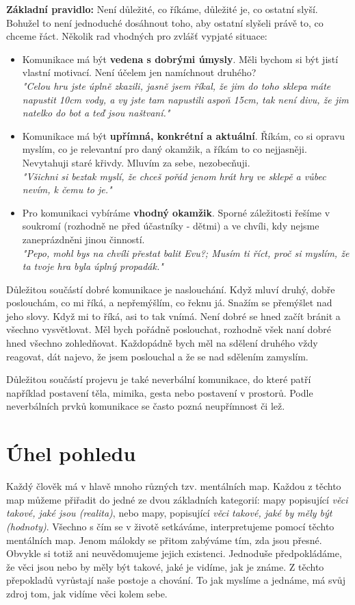 \documentclass[a4paper,12pt]{report}
\begin{document}
\textbf{Základní pravidlo:} Není důležité, co říkáme, důležité je, co ostatní slyší. Bohužel to není jednoduché dosáhnout toho, aby ostatní slyšeli právě to, co chceme řáct. Několik rad vhodných pro zvlášť vypjaté situace:

\begin{itemize}
 \item Komunikace má být \textbf{vedena s dobrými úmysly}. Měli bychom si být jistí vlastní motivací. Není účelem jen namíchnout druhého?\\
 \textit{"Celou hru jste úplně zkazili, jasně jsem říkal, že jim do toho sklepa máte napustit 10cm vody, a vy jste tam napustili aspoň 15cm, tak není divu, že jim natelko do bot a teď jsou naštvaní."}
 
 \item Komunikace má být \textbf{upřímná, konkrétní a aktuální}. Říkám, co si opravu myslím, co je relevantní pro daný okamžik, a říkám to co nejjasněji. Nevytahuji staré křivdy. Mluvím za sebe, nezobecňuji.\\
 \textit{"Všichni si beztak myslí, že chceš pořád jenom hrát hry ve sklepě a vůbec nevím, k čemu to je."}
 
 \item Pro komunikaci vybíráme \textbf{vhodný okamžik}. Sporné záležitosti řešíme v soukromí (rozhodně ne před účastníky - dětmi) a ve chvíli, kdy nejsme zaneprázdněni jinou činností.\\
 \textit{"Pepo, mohl bys na chvíli přestat balit Evu?; Musím ti říct, proč si myslím, že ta tvoje hra byla úplný propadák."}
\end{itemize}

Důležitou součástí dobré komunikace je naslouchání. Když mluví druhý, dobře poslouchám, co mi říká, a nepřemýšlím, co řeknu já. Snažím se přemýšlet nad jeho slovy. Když mi to říká, asi to tak vnímá. Není dobré se hned začít bránit a všechno vysvětlovat. Měl bych pořádně poslouchat, rozhodně všek naní dobré hned všechno zohledňovat. Každopádně bych měl na sdělení druhého vždy reagovat, dát najevo, že jsem poslouchal a že se nad sdělením zamyslím.

Důležitou součástí projevu je také neverbální komunikace, do které patří například postavení těla, mimika, gesta nebo postavení v prostorů. Podle neverbálních prvků komunikace se často pozná neupřímnost či lež.

\section[Úhel pohledu]{Úhel pohledu}
\pagelogos
Každý člověk má v hlavě mnoho různých tzv. mentálních map. Každou z těchto map můžeme přiřadit do jedné ze dvou základních kategorií: mapy popisující \textit{věci takové, jaké jsou (realita)}, nebo mapy, popisující \textit{věci takové, jaké by měly být (hodnoty)}. Všechno s čím se v životě setkáváme, interpretujeme pomocí těchto mentálních map. Jenom málokdy se přitom zabýváme tím, zda jsou přesné. Obvykle si totiž ani neuvědomujeme jejich existenci. Jednoduše předpokládáme, že věci jsou nebo by měly být takové, jaké je vidíme, jak je známe.
Z těchto přepokladů vyrůstají naše postoje a chování. To jak myslíme a jednáme, má svůj zdroj tom, jak vidíme věci kolem sebe.
\end{document}

